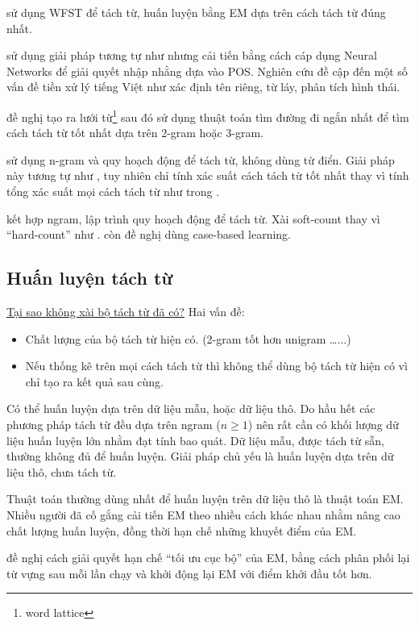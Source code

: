 \documentclass[a4paper,oneside]{book} %
\newcommand{\note}[1]{\underline{#1}}
\begin{document}
\cite{Sproat} sử dụng WFST để tách từ, huấn luyện bằng EM dựa trên
cách tách từ đúng nhất.

\cite{wordseg} sử dụng giải pháp tương tự như \cite{Sproat} nhưng cải
tiến bằng cách cáp dụng Neural Networks để giải quyết nhập nhằng dựa
vào POS. Nghiên cứu đề cập đến một số vấn đề tiền xử lý tiếng Việt như
xác định tên riêng, từ láy, phân tích hình thái.

\cite{Ravishankar} đề nghị tạo ra lưới từ\footnote{word lattice} sau
đó sử dụng thuật toán tìm đường đi ngắn nhất để tìm cách tách từ tốt
nhất dựa trên 2-gram hoặc 3-gram.

\cite{LAH} sử dụng n-gram và quy hoạch động để tách từ,
không dùng từ điển. Giải pháp này tương tự như \cite{softcount}, tuy
nhiên chỉ tính xác suất cách tách từ tốt nhất thay vì tính tổng xác
suất mọi cách tách từ như trong \cite{softcount}.

\cite{Chunyu} kết hợp ngram, lập trình quy hoạch động để tách từ. Xài
soft-count thay vì ``hard-count'' như \cite{Chang}. \cite{Chunyu} còn
đề nghị dùng case-based learning.

\subsection{Huấn luyện tách từ}

\note{Tại sao không xài bộ tách từ đã có?} Hai vấn đề:
\begin{itemize}
\item Chất lượng của bộ tách từ hiện có. (2-gram tốt hơn unigram
  \ldots...)
\item Nếu thống kê trên mọi cách tách từ thì không thể dùng bộ tách từ
  hiện có vì chỉ tạo ra kết quả sau cùng.
\end{itemize}


Có thể huấn luyện dựa trên dữ liệu mẫu, hoặc dữ liệu thô. Do hầu hết
các phương pháp tách từ đều dựa trên ngram ($n\ge 1$) nên rất cần có
khối lượng dữ liệu huấn luyện lớn nhằm đạt tính bao quát. Dữ liệu
mẫu, được tách từ sẵn, thường không đủ để huấn luyện. Giải pháp chủ
yếu là huấn luyện dựa trên dữ liệu thô, chưa tách từ.

Thuật toán thường dùng nhất để huấn luyện trên dữ liệu thô là thuật
toán EM. Nhiều người đã cố gắng cải tiến EM theo nhiều cách khác nhau
nhằm nâng cao chất lượng huấn luyện, đồng thời hạn chế những khuyết
điểm của EM. 

\cite{self-supervised} đề nghị cách giải quyết hạn chế ``tối ưu cục
bộ'' của EM, bằng cách phân phối lại từ vựng sau mỗi lần chạy và khởi
động lại EM với điểm khởi đầu tốt hơn.
\end{document}
